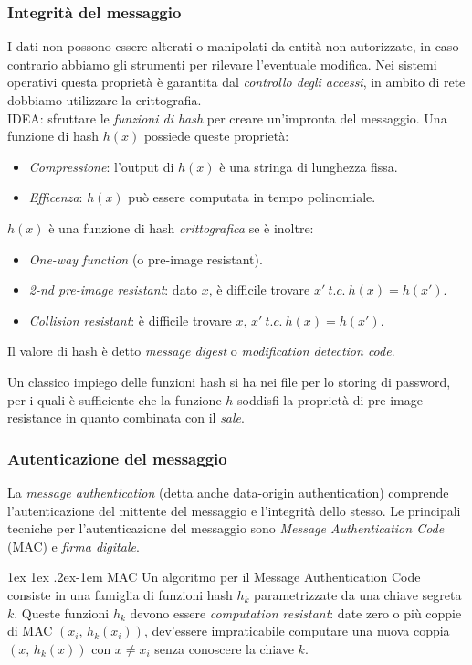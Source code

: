\documentclass[a4paper, 11pt, twoside, openright, fleqn]{report}
\makeatletter
\renewcommand{\paragraph}{%
	\@startsection{paragraph}{4}%
	{\z@}{1ex \@plus 1ex \@minus .2ex}{-1em}%
	{\normalfont\normalsize\bfseries}%
}
\makeatother
\begin{document}
\subsubsection{Integrità del messaggio}
I dati non possono essere alterati o manipolati da entità non autorizzate, in caso contrario abbiamo gli strumenti per rilevare l'eventuale modifica. Nei sistemi operativi questa proprietà è garantita dal \emph{controllo degli accessi}, in ambito di rete dobbiamo utilizzare la crittografia.\\
IDEA: sfruttare le \emph{funzioni di hash} per creare un'impronta del messaggio. Una funzione di hash $h(x)$ possiede queste proprietà:
\begin{itemize}
	\item \emph{Compressione}: l'output di $h(x)$ è una stringa di lunghezza fissa.
	\item \emph{Efficenza}: $h(x)$ può essere computata in tempo polinomiale.
\end{itemize}
$h(x)$ è una funzione di hash \emph{crittografica} se è inoltre:
\begin{itemize}
	\item \emph{One-way function} (o pre-image resistant).
	\item \emph{2-nd pre-image resistant}: dato $x$, è difficile trovare $x'\ t.c.\ h(x)=h(x')$.
	\item \emph{Collision resistant}: è difficile trovare $x,\,x'\ t.c.\ h(x)=h(x')$.
\end{itemize}
Il valore di hash è detto \emph{message digest} o \emph{modification detection code}.

Un classico impiego delle funzioni hash si ha nei file per lo storing di password, per i quali è sufficiente che la funzione $h$ soddisfi la proprietà di pre-image resistance in quanto combinata con il \emph{sale}.


\subsubsection{Autenticazione del messaggio}
La \emph{message authentication} (detta anche data-origin authentication) comprende l'autenticazione del mittente del messaggio e l'integrità dello stesso. Le principali tecniche per l'autenticazione del messaggio sono \emph{Message Authentication Code} (MAC) e \emph{firma digitale}.

\paragraph{MAC}
Un algoritmo per il Message Authentication Code consiste in una famiglia di funzioni hash $h_k$ parametrizzate da una chiave segreta $k$. Queste funzioni $h_k$ devono essere \emph{computation resistant}: date zero o più coppie di MAC $(x_i,\,h_k(x_i))$, dev'essere impraticabile computare una nuova coppia $(x,\,h_k(x))$ con $x\neq x_i$ senza conoscere la chiave $k$.
\end{document}
